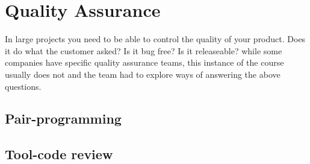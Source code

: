 \section {Quality Assurance}

In large projects you need to be able to control the quality of your product. Does it do what the customer asked? Is it bug free? Is it releaseable? while some companies have specific quality assurance teams, this instance of the course usually does not and the team had to explore ways of answering the above questions.

\subsection{Pair-programming}

\subsection{Tool-code review}
